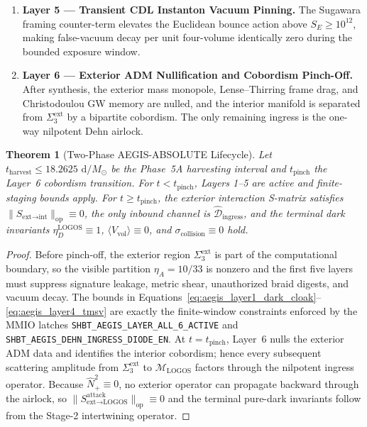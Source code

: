 \documentclass[11pt,onecolumn]{article}
\newtheorem{theorem}{Theorem}
\begin{document}
\begin{enumerate}
\begin{equation}
    \label{eq:aegis_layer4_tmsv}
    \end{equation}
    \item \textbf{Layer 5 --- Transient CDL Instanton Vacuum Pinning.} The Sugawara framing counter-term elevates the Euclidean bounce action above $S_E\ge10^{12}$, making false-vacuum decay per unit four-volume identically zero during the bounded exposure window.
    \item \textbf{Layer 6 --- Exterior ADM Nullification and Cobordism Pinch-Off.} After synthesis, the exterior mass monopole, Lense--Thirring frame drag, and Christodoulou GW memory are nulled, and the interior manifold is separated from $\Sigma_3^{\text{ext}}$ by a bipartite cobordism. The only remaining ingress is the one-way nilpotent Dehn airlock.
\end{enumerate}

\begin{theorem}[Two-Phase AEGIS-ABSOLUTE Lifecycle]
\label{thm:aegis_two_phase_lifecycle}
Let $t_{\text{harvest}}\le18.2625\text{ d}/M_\odot$ be the Phase~5A harvesting interval and $t_{\text{pinch}}$ the Layer~6 cobordism transition. For $t<t_{\text{pinch}}$, Layers 1--5 are active and finite-staging bounds apply. For $t\ge t_{\text{pinch}}$, the exterior interaction S-matrix satisfies $\|S_{\text{ext}\to\text{int}}\|_{\text{op}}\equiv0$, the only inbound channel is $\hat{\mathcal D}_{\text{ingress}}$, and the terminal dark invariants $\eta_D^{\text{LOGOS}}\equiv1$, $\langle V_{\text{vol}}\rangle\equiv0$, and $\sigma_{\text{collision}}\equiv0$ hold.
\end{theorem}

\begin{proof}
Before pinch-off, the exterior region $\Sigma_3^{\text{ext}}$ is part of the computational boundary, so the visible partition $\eta_A=10/33$ is nonzero and the first five layers must suppress signature leakage, metric shear, unauthorized braid digests, and vacuum decay. The bounds in Equations~\eqref{eq:aegis_layer1_dark_cloak}--\eqref{eq:aegis_layer4_tmsv} are exactly the finite-window constraints enforced by the MMIO latches \texttt{SHBT\_AEGIS\_LAYER\_ALL\_6\_ACTIVE} and \texttt{SHBT\_AEGIS\_DEHN\_INGRESS\_DIODE\_EN}. At $t=t_{\text{pinch}}$, Layer~6 nulls the exterior ADM data and identifies the interior cobordism; hence every subsequent scattering amplitude from $\Sigma_3^{\text{ext}}$ to $\mathcal M_{\text{LOGOS}}$ factors through the nilpotent ingress operator. Because $\hat N_+^2\equiv0$, no exterior operator can propagate backward through the airlock, so $\|S_{\text{ext}\to\text{LOGOS}}^{\text{attack}}\|_{\text{op}}\equiv0$ and the terminal pure-dark invariants follow from the Stage-2 intertwining operator.
\end{proof}
\end{document}
